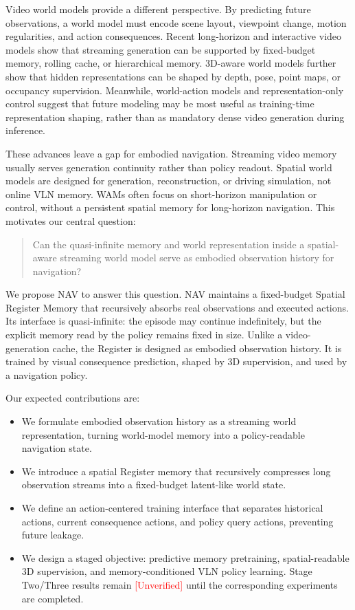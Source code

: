 \documentclass[11pt,a4paper]{ctexart}
\newcommand{\method}{NAV}
\newcommand{\reg}{Spatial Register Memory}
\newcommand{\unverified}{\textcolor{red}{[Unverified]}}
\begin{document}
Video world models provide a different perspective. By predicting future observations, a world model must encode scene layout, viewpoint change, motion regularities, and action consequences. Recent long-horizon and interactive video models show that streaming generation can be supported by fixed-budget memory, rolling cache, or hierarchical memory. 3D-aware world models further show that hidden representations can be shaped by depth, pose, point maps, or occupancy supervision. Meanwhile, world-action models and representation-only control suggest that future modeling may be most useful as training-time representation shaping, rather than as mandatory dense video generation during inference.

These advances leave a gap for embodied navigation. Streaming video memory usually serves generation continuity rather than policy readout. Spatial world models are designed for generation, reconstruction, or driving simulation, not online VLN memory. WAMs often focus on short-horizon manipulation or control, without a persistent spatial memory for long-horizon navigation. This motivates our central question:

\begin{quote}
Can the quasi-infinite memory and world representation inside a spatial-aware streaming world model serve as embodied observation history for navigation?
\end{quote}

We propose \method{} to answer this question. \method{} maintains a fixed-budget \reg{} that recursively absorbs real observations and executed actions. Its interface is quasi-infinite: the episode may continue indefinitely, but the explicit memory read by the policy remains fixed in size. Unlike a video-generation cache, the Register is designed as embodied observation history. It is trained by visual consequence prediction, shaped by 3D supervision, and used by a navigation policy.

Our expected contributions are:
\begin{itemize}
    \item We formulate embodied observation history as a streaming world representation, turning world-model memory into a policy-readable navigation state.
    \item We introduce a spatial Register memory that recursively compresses long observation streams into a fixed-budget latent-like world state.
    \item We define an action-centered training interface that separates historical actions, current consequence actions, and policy query actions, preventing future leakage.
    \item We design a staged objective: predictive memory pretraining, spatial-readable 3D supervision, and memory-conditioned VLN policy learning. Stage Two/Three results remain \unverified{} until the corresponding experiments are completed.
\end{itemize}
\end{document}

